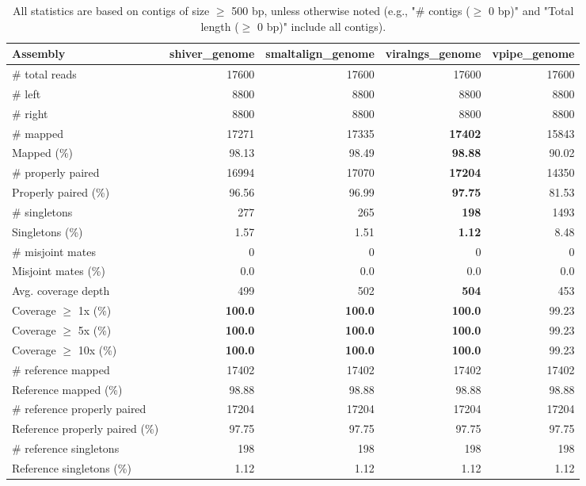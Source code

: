 \documentclass[12pt,a4paper]{article}
\begin{document}
\begin{table}[ht]
\begin{center}
\caption{All statistics are based on contigs of size $\geq$ 500 bp, unless otherwise noted (e.g., "\# contigs ($\geq$ 0 bp)" and "Total length ($\geq$ 0 bp)" include all contigs).}
\begin{tabular}{|l*{4}{|r}|}
\hline
Assembly & shiver\_genome & smaltalign\_genome & viralngs\_genome & vpipe\_genome \\ \hline
\# total reads & 17600 & 17600 & 17600 & 17600 \\ \hline
\# left & 8800 & 8800 & 8800 & 8800 \\ \hline
\# right & 8800 & 8800 & 8800 & 8800 \\ \hline
\# mapped & 17271 & 17335 & {\bf 17402} & 15843 \\ \hline
Mapped (\%) & 98.13 & 98.49 & {\bf 98.88} & 90.02 \\ \hline
\# properly paired & 16994 & 17070 & {\bf 17204} & 14350 \\ \hline
Properly paired (\%) & 96.56 & 96.99 & {\bf 97.75} & 81.53 \\ \hline
\# singletons & 277 & 265 & {\bf 198} & 1493 \\ \hline
Singletons (\%) & 1.57 & 1.51 & {\bf 1.12} & 8.48 \\ \hline
\# misjoint mates & 0 & 0 & 0 & 0 \\ \hline
Misjoint mates (\%) & 0.0 & 0.0 & 0.0 & 0.0 \\ \hline
Avg. coverage depth & 499 & 502 & {\bf 504} & 453 \\ \hline
Coverage $\geq$ 1x (\%) & {\bf 100.0} & {\bf 100.0} & {\bf 100.0} & 99.23 \\ \hline
Coverage $\geq$ 5x (\%) & {\bf 100.0} & {\bf 100.0} & {\bf 100.0} & 99.23 \\ \hline
Coverage $\geq$ 10x (\%) & {\bf 100.0} & {\bf 100.0} & {\bf 100.0} & 99.23 \\ \hline
\# reference mapped & 17402 & 17402 & 17402 & 17402 \\ \hline
Reference mapped (\%) & 98.88 & 98.88 & 98.88 & 98.88 \\ \hline
\# reference properly paired & 17204 & 17204 & 17204 & 17204 \\ \hline
Reference properly paired (\%) & 97.75 & 97.75 & 97.75 & 97.75 \\ \hline
\# reference singletons & 198 & 198 & 198 & 198 \\ \hline
Reference singletons (\%) & 1.12 & 1.12 & 1.12 & 1.12 \\ \hline

\end{tabular}
\end{center}
\end{table}
\end{document}
